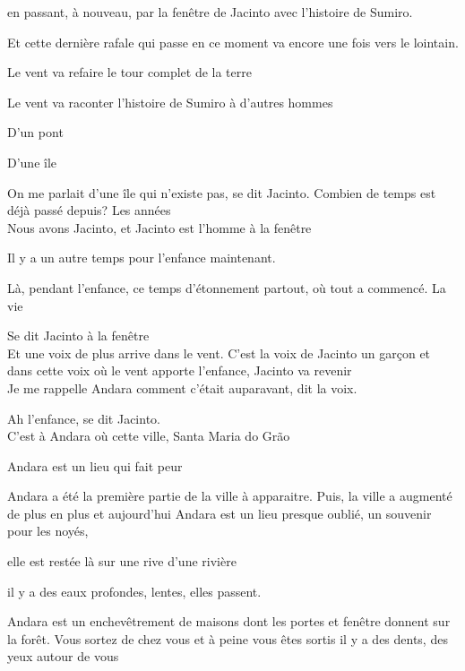 en passant, à nouveau, par la fenêtre de Jacinto avec l'histoire de
Sumiro.

Et cette dernière rafale qui passe en ce moment va encore une fois vers
le lointain.

Le vent va refaire le tour complet de la terre

Le vent va raconter l'histoire de Sumiro à d'autres hommes

\clearpage
\thispagestyle{empty}
\movetoevenpage

\vspace*{4cm}

D'un pont

D'une île

On me parlait d'une île qui n'existe pas, se dit Jacinto. Combien de
temps est déjà passé depuis? Les années\\

Nous avons Jacinto, et Jacinto est l'homme à la fenêtre

\breakk

\vspace*{4cm}

Il y a un autre temps pour l'enfance maintenant.

Là, pendant l'enfance, ce temps d'étonnement partout, où tout a
commencé. La vie

Se dit Jacinto à la fenêtre\\

Et une voix de plus arrive dans le vent. C'est la voix de Jacinto un
garçon et dans cette voix où le vent apporte l'enfance, Jacinto va
revenir\\

Je me rappelle Andara comment c'était auparavant, dit la voix.

Ah l'enfance, se dit Jacinto.\\

C'est à Andara où cette ville, Santa Maria do Grão

Andara est un lieu qui fait peur

Andara a été la première partie de la ville à apparaitre. Puis, la ville
a augmenté de plus en plus et aujourd'hui Andara est un lieu presque
oublié, un souvenir pour les noyés,

elle est restée là sur une rive d'une rivière

il y a des eaux profondes, lentes, elles passent.

Andara est un enchevêtrement de maisons dont les portes et fenêtre
donnent sur la forêt. Vous sortez de chez vous et à peine vous êtes
sortis il y a des dents, des yeux autour de vous


